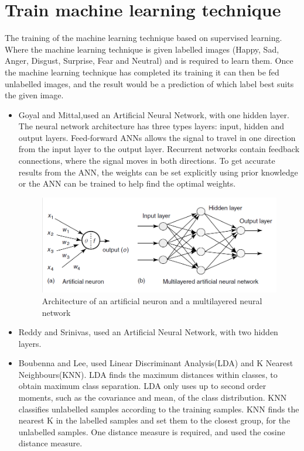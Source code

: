 \section{Train machine learning technique}
The training of the machine learning technique based on supervised learning. Where the machine learning technique is given labelled images (Happy, Sad, Anger, Disgust, Surprise, Fear and Neutral) and is required to learn them. Once the machine learning technique has completed its training it can then be fed unlabelled images, and the result would be a prediction of which label best suits the given image. 
\begin{itemize}
\item Goyal and Mittal,used an Artificial Neural Network, with one hidden layer. The neural network architecture has three types layers: input, hidden and output layers. Feed-forward ANNs allows the signal to travel in one direction from the input layer to the output layer. Recurrent networks contain feedback connections, where the signal moves in both directions. To get accurate results from the ANN, the weights can be set explicitly using prior knowledge or the ANN can be trained to help find the optimal weights\cite{1, ann}.
\begin{figure}[ht]
  \centering
  \includegraphics[scale=0.4]{8}
  \caption{Architecture of an artificial neuron and a multilayered neural network }
\end{figure}
\item Reddy and Srinivas, used an Artificial Neural Network, with two hidden layers\cite{2}. 
\item Boubenna and Lee, used Linear Discriminant Analysis(LDA) and K Nearest Neighbours(KNN). LDA finds the maximum distances within classes, to obtain maximum class separation. LDA only uses up to second order moments, such as the covariance and mean, of the class distribution. KNN classifies unlabelled samples according to the training samples. KNN finds the nearest K in the labelled samples and set them to the closest group, for the unlabelled samples. One distance measure is required, and \cite{3} used the cosine distance measure.
\end{itemize}
